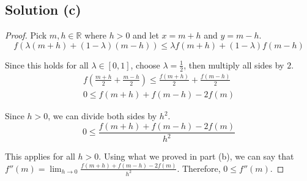 \documentclass[11pt]{article}
\begin{document}
    \subsection{Solution (c)}
        \begin{proof}
            Pick $m,h \in \mathbb{R}$ where $h > 0$ and let $x = m + h$ and $y = m - h$.
            \begin{equation}
                f(\lambda (m + h) + (1 - \lambda) (m - h)) \leq \lambda f(m + h) + (1 - \lambda) f(m - h)
            \end{equation}

            Since this holds for all $\lambda \in [0,1]$, choose $\lambda = \frac{1}{2}$, then multiply all sides by $2$.
            \begin{gather}
                f\left( \frac{m + h}{2} + \frac{m - h}{2}\right) \leq \frac{f(m + h)}{2} + \frac{f(m - h)}{2}\\
                0 \leq f(m + h) + f(m - h) - 2f(m)
            \end{gather}

            Since $h > 0$, we can divide both sides by $h^2$.
            \begin{equation}
                0 \leq \frac{f(m + h) + f(m - h) - 2f(m)}{h^2}
            \end{equation}

            This applies for all $h > 0$.
            Using what we proved in part (b), we can say that $f''(m) = \lim_{h \to 0} \frac{f(m + h) + f(m - h) - 2f(m)}{h^2}$.
            Therefore, $0 \leq f''(m)$.
        \end{proof}
\end{document}
